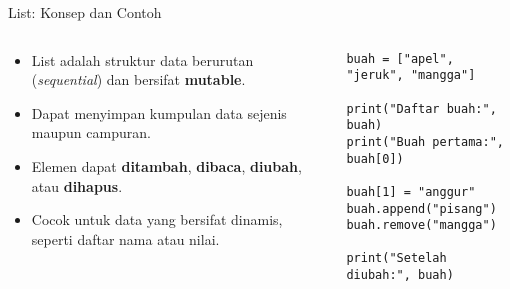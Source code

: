 \documentclass[aspectratio=169, table]{beamer}
\begin{document}
\begin{frame}[fragile]{List: Konsep dan Contoh}
\vspace{20pt}

\begin{columns}[T]
  \begin{column}{0.48\textwidth}
    \begin{itemize}
      \item List adalah struktur data berurutan (\textit{sequential}) dan bersifat \textbf{mutable}.
      \item Dapat menyimpan kumpulan data sejenis maupun campuran.
      \item Elemen dapat \textbf{ditambah}, \textbf{dibaca}, \textbf{diubah}, atau \textbf{dihapus}.
      \item Cocok untuk data yang bersifat dinamis, seperti daftar nama atau nilai.
    \end{itemize}
  \end{column}

  \begin{column}{0.48\textwidth}
    \begin{lstlisting}[style=PythonStyle]
buah = ["apel", "jeruk", "mangga"]

print("Daftar buah:", buah)
print("Buah pertama:", buah[0])

buah[1] = "anggur"
buah.append("pisang")
buah.remove("mangga")

print("Setelah diubah:", buah)
    \end{lstlisting}
  \end{column}
\end{columns}

\end{frame}
\end{document}
